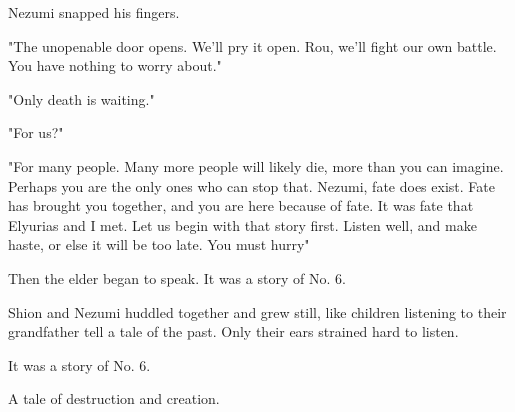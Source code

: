 Nezumi snapped his fingers.

"The unopenable door opens. We'll pry it open. Rou, we'll fight our own
battle. You have nothing to worry about."

"Only death is waiting."

"For us?"

"For many people. Many more people will likely die, more than you can
imagine. Perhaps you are the only ones who can stop that. Nezumi, fate
does exist. Fate has brought you together, and you are here because of
fate. It was fate that Elyurias and I met. Let us begin with that story
first. Listen well, and make haste, or else it will be too late. You
must hurry\el "

Then the elder began to speak. It was a story of No. 6.

Shion and Nezumi huddled together and grew still, like children
listening to their grandfather tell a tale of the past. Only their ears
strained hard to listen.

It was a story of No. 6.

A tale of destruction and creation.